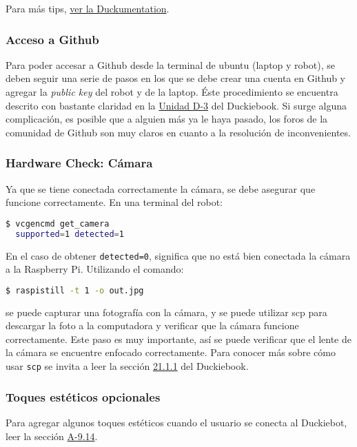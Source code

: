 \documentclass[12pt]{article}
\begin{document}
Para más tips, \href{https://bit.ly/2sDGz4x}{ver la Duckumentation}.

\subsubsection{Acceso a Github}

Para poder accesar a Github desde la terminal de ubuntu (laptop y robot), se deben seguir una serie de pasos en los que se debe crear una cuenta en Github y agregar la \textit{public key} del robot y de la laptop. Éste procedimiento se encuentra descrito con bastante claridad en la \href{https://bit.ly/2srMPNd}{Unidad D-3} del Duckiebook. Si surge alguna complicación, es posible que a alguien más ya le haya pasado, los foros de la comunidad de Github son muy claros en cuanto a la resolución de inconvenientes. 


\subsubsection{Hardware Check: Cámara}

Ya que se tiene conectada correctamente la cámara, se debe asegurar que funcione correctamente. En una terminal del robot:

 \begin{lstlisting}[language=bash]
  $ vcgencmd get_camera
  supported=1 detected=1
\end{lstlisting}

En el caso de obtener \texttt{detected=0}, significa que no está bien conectada la cámara a la Raspberry Pi. Utilizando el comando:

\begin{lstlisting}[language=bash]
  $ raspistill -t 1 -o out.jpg
\end{lstlisting}

se puede capturar una fotografía con la cámara, y se puede utilizar scp para descargar la foto a la computadora y verificar que la cámara funcione correctamente. Este paso es muy importante, así se puede verificar que el lente de la cámara se encuentre enfocado correctamente. Para conocer más sobre cómo usar \texttt{scp} se invita a leer la sección \href{https://bit.ly/2sCVuvN}{21.1.1} del Duckiebook.

\subsubsection{Toques estéticos opcionales}

Para agregar algunos toques estéticos cuando el usuario se conecta al Duckiebot, leer la sección \href{https://bit.ly/2xDs5aj}{A-9.14}.
\end{document}
